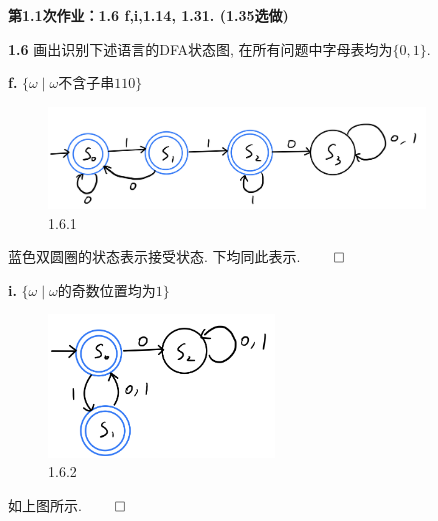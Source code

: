 \documentclass[UTF8]{report}
\newcommand{\problem}[1]{{\setlength{\parskip}{10pt}\noindent \bf{#1}}}
\renewenvironment{proof}{{\setlength{\parskip}{7pt}\noindent\hskip 2em \bf 证明 \quad}}{\hfill$\qed$\par}
\begin{document}

\maketitle



\textbf{第1.1次作业：1.6 f,i,1.14, 1.31. (1.35选做)}

\problem{1.6} 画出识别下述语言的DFA状态图, 在所有问题中字母表均为$\{0,1\}$.

\problem{f.} $\{\omega \mid \omega \text{不含子串}110\}$

\begin{proof}
    \begin{figure}[!htbp]
        \centering
        \includegraphics[width=10cm]{image/1.6.1.png}
        \caption{1.6.1}
        \label{fig:1_6f}
    \end{figure}

    蓝色双圆圈的状态表示接受状态. 下均同此表示.
\end{proof}

\problem{i.} $\{\omega \mid \omega \text{的奇数位置均为}1\}$

\begin{proof}
    \begin{figure}[!htbp]
        \centering
        \includegraphics[width=6cm]{image/1.6.2.png}
        \caption{1.6.2}
        \label{fig:1_6i}
    \end{figure}

    如上图所示.
\end{proof}
\end{document}
